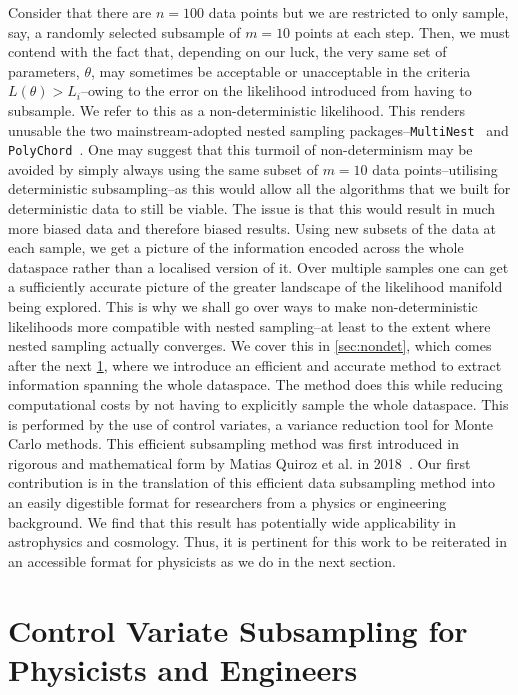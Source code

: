 Consider that there are $n=100$ data points but we are restricted to only sample, say, a randomly selected subsample of $m=10$ points at each step. Then, we must contend with the fact that, depending on our luck, the very same set of parameters, $\theta$, may sometimes be acceptable or unacceptable in the criteria $L(\theta)>L_i$--owing to the error on the likelihood introduced from having to subsample. We refer to this as a non-deterministic likelihood. This renders unusable the two mainstream-adopted nested sampling packages--\texttt{MultiNest}~\cite{Feroz_2009} and \texttt{\texttt{PolyChord}}~\cite{Handley_2015}. One may suggest that this turmoil of non-determinism may be avoided by simply always using the same subset of $m=10$ data points--utilising deterministic subsampling--as this would allow all the algorithms that we built for deterministic data to still be viable. The issue is that this would result in much more biased data and therefore biased results. Using new subsets of the data at each sample, we get a picture of the information encoded across the whole dataspace rather than a localised version of it. Over multiple samples one can get a sufficiently accurate picture of the greater landscape of the likelihood manifold being explored. This is why we shall go over ways to make non-deterministic likelihoods more compatible with nested sampling--at least to the extent where nested sampling actually converges. We cover this in \cref{sec:nondet}, which comes after the next \cref{sec:control_variates}, where we introduce an efficient and accurate method to extract information spanning the whole dataspace. The method does this while reducing computational costs by not having to explicitly sample the whole dataspace. This is performed by the use of control variates, a variance reduction tool for Monte Carlo methods. This efficient subsampling method was first introduced in rigorous and mathematical form by Matias Quiroz et al. in 2018~\cite{Quiroz_2018}. Our first contribution is in the translation of this efficient data subsampling method into an easily digestible format for researchers from a physics or engineering background. We find that this result has potentially wide applicability in astrophysics and cosmology. Thus, it is pertinent for this work to be reiterated in an accessible format for physicists as we do in the next section.


\section{Control Variate Subsampling for Physicists and Engineers}\label{sec:control_variates}

